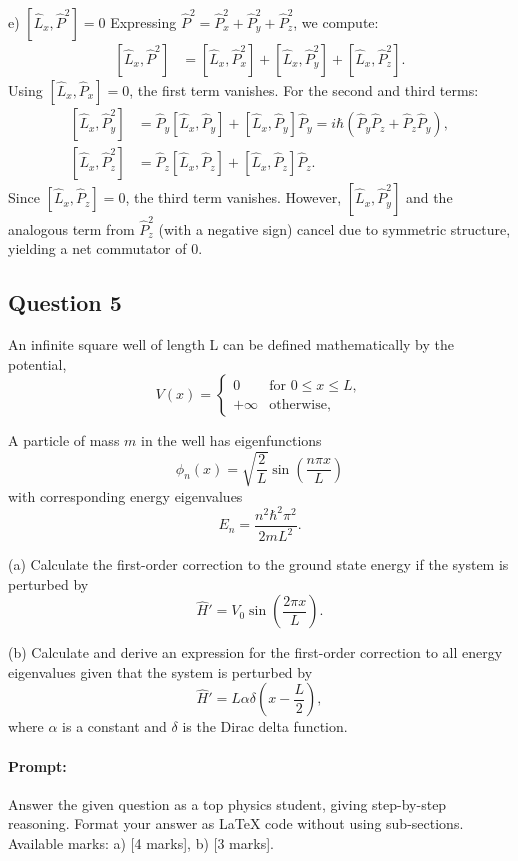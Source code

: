 \documentclass{article}
\begin{document}
e) $\left[\hat{L}_x, \hat{P}^2\right] = 0$
Expressing $\hat{P}^2 = \hat{P}_x^2 + \hat{P}_y^2 + \hat{P}_z^2$, we compute:
\begin{align*}
\left[\hat{L}_x, \hat{P}^2\right] &= \left[\hat{L}_x, \hat{P}_x^2\right] + \left[\hat{L}_x, \hat{P}_y^2\right] + \left[\hat{L}_x, \hat{P}_z^2\right].
\end{align*}
Using $\left[\hat{L}_x, \hat{P}_x\right] = 0$, the first term vanishes. For the second and third terms:
\begin{align*}
\left[\hat{L}_x, \hat{P}_y^2\right] &= \hat{P}_y\left[\hat{L}_x, \hat{P}_y\right] + \left[\hat{L}_x, \hat{P}_y\right]\hat{P}_y = i\hbar(\hat{P}_y\hat{P}_z + \hat{P}_z\hat{P}_y), \\
\left[\hat{L}_x, \hat{P}_z^2\right] &= \hat{P}_z\left[\hat{L}_x, \hat{P}_z\right] + \left[\hat{L}_x, \hat{P}_z\right]\hat{P}_z.
\end{align*}
Since $\left[\hat{L}_x, \hat{P}_z\right] = 0$, the third term vanishes. However, $\left[\hat{L}_x, \hat{P}_y^2\right]$ and the analogous term from $\hat{P}_z^2$ (with a negative sign) cancel due to symmetric structure, yielding a net commutator of $0$.

\subsection{Question 5}
An infinite square well of length L can be defined mathematically by the potential,
\[
V(x) = 
\begin{cases} 
0 & \text{for } 0 \leq x \leq L, \\
+\infty & \text{otherwise},
\end{cases}
\]

A particle of mass \(m\) in the well has eigenfunctions
\[
\phi_n(x) = \sqrt{\frac{2}{L}} \sin\left(\frac{n \pi x}{L}\right)
\]
with corresponding energy eigenvalues
\[
E_n = \frac{n^2 \hbar^2 \pi^2}{2mL^2}.
\]

(a) Calculate the first-order correction to the ground state energy if the system is perturbed by
\[
\hat{H}' = V_0 \sin\left(\frac{2\pi x}{L}\right).
\]

(b) Calculate and derive an expression for the first-order correction to all energy eigenvalues given that the system is perturbed by
\[
\hat{H}' = L \alpha \delta\left(x - \frac{L}{2}\right),
\]
where \(\alpha\) is a constant and \(\delta\) is the Dirac delta function.

\paragraph{Prompt: \\} 
Answer the given question as a top physics student, giving step-by-step reasoning. Format your answer as LaTeX code without using sub-sections. Available marks: a) [4 marks], b) [3 marks].
\end{document}
